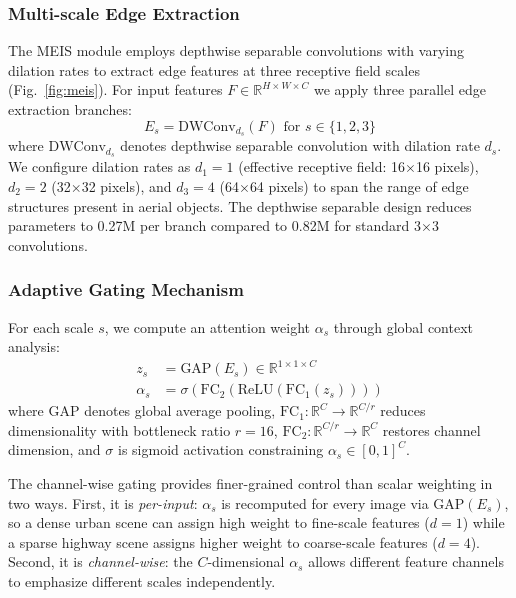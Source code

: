 \documentclass[preprint,12pt]{elsarticle}
\begin{document}
\subsubsection{Multi-scale Edge Extraction}

The MEIS module employs depthwise separable convolutions with varying dilation
rates to extract edge features at three receptive field scales
(Fig.~\ref{fig:meis}). For input features $F \in \mathbb{R}^{H \times W \times C}$
we apply three parallel edge extraction branches:
\begin{equation}
E_s = \text{DWConv}_{d_s}(F) \text{ for } s \in \{1, 2, 3\}
\end{equation}
where $\text{DWConv}_{d_s}$ denotes depthwise separable convolution with dilation
rate $d_s$. We configure dilation rates as $d_1=1$ (effective receptive field:
16$\times$16 pixels), $d_2=2$ (32$\times$32 pixels), and $d_3=4$ (64$\times$64
pixels) to span the range of edge structures present in aerial objects. The
depthwise separable design reduces parameters to 0.27M per branch compared to
0.82M for standard 3$\times$3 convolutions.

\subsubsection{Adaptive Gating Mechanism}

For each scale $s$, we compute an attention weight $\alpha_s$ through global
context analysis:
\begin{align}
z_s &= \text{GAP}(E_s) \in \mathbb{R}^{1 \times 1 \times C} \\
\alpha_s &= \sigma(\text{FC}_2(\text{ReLU}(\text{FC}_1(z_s))))
\end{align}
where $\text{GAP}$ denotes global average pooling, $\text{FC}_1: \mathbb{R}^C
\rightarrow \mathbb{R}^{C/r}$ reduces dimensionality with bottleneck ratio
$r=16$, $\text{FC}_2: \mathbb{R}^{C/r} \rightarrow \mathbb{R}^C$ restores
channel dimension, and $\sigma$ is sigmoid activation constraining $\alpha_s \in
[0,1]^C$.

The channel-wise gating provides finer-grained control than scalar weighting in
two ways. First, it is \emph{per-input}: $\alpha_s$ is recomputed for every image
via $\text{GAP}(E_s)$, so a dense urban scene can assign high weight to
fine-scale features ($d{=}1$) while a sparse highway scene assigns higher weight
to coarse-scale features ($d{=}4$). Second, it is \emph{channel-wise}: the
$C$-dimensional $\alpha_s$ allows different feature channels to emphasize
different scales independently.
\end{document}
